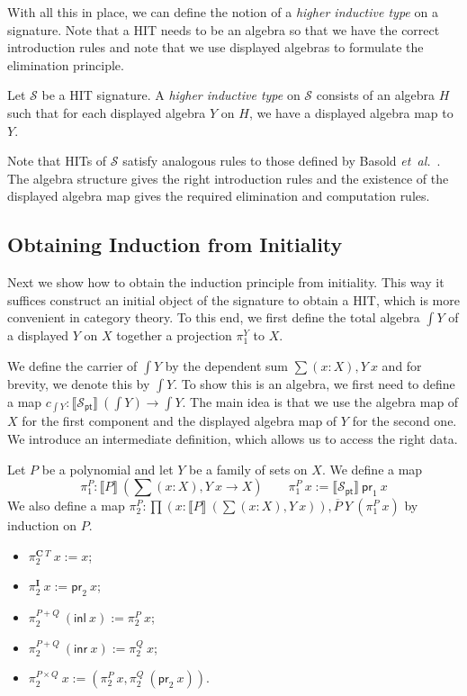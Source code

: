 \documentclass[9pt]{entcs}
\newcommand{\etal}{\emph{et~al.}}
\newcommand{\term}[1]{\mathsf{#1}}
\newcommand{\constructor}[1]{\mathbf{#1}}
\newcommand{\deprod}[3]{\prod(#1 : #2), #3} %
\newcommand{\desum}[3]{\sum(#1 : #2), #3} %
\newcommand{\0}{\textbf{0}} %
\newcommand{\inl}{\term{inl}} %
\newcommand{\inr}{\term{inr}} %
\newcommand{\prl}{\term{pr}_1} %
\newcommand{\prr}{\term{pr}_2} %
\newcommand{\Def}{:=} %
\newcommand{\C}{\constructor{C}} %
\newcommand{\I}{\constructor{I}} %
\newcommand{\sumP}[2]{#1 + #2} %
\newcommand{\prodP}[2]{#1 \times #2} %
\newcommand{\pt}[0]{\textsf{pt}}
\newcommand{\pointc}[1]{#1_{\pt}} %
\newcommand{\sig}{\mathcal{S}} %
\newcommand{\semP}[1]{\llbracket #1 \rrbracket} %
\newcommand{\polydact}[2]{\overline{#1} \> #2} %
\newcommand{\total}[1]{\int #1} %
\newcommand{\proj}[1]{\pi_1^{#1}} %
\newcommand{\Ppl}[1]{\pi_1^{#1}} %
\newcommand{\Ppr}[1]{\pi_2^{#1}} %
\begin{document}
With all this in place, we can define the notion of a \emph{higher inductive type} on a signature.
Note that a HIT needs to be an algebra so that we have the correct introduction rules and note that we use displayed algebras to formulate the elimination principle.

\begin{definition}
Let $\sig$ be a HIT signature.
A \emph{higher inductive type} on $\sig$ consists of an algebra $H$ such that for each displayed algebra $Y$ on $H$, we have a displayed algebra map to $Y$.
\end{definition}

Note that HITs of $\sig$ satisfy analogous rules to those defined by Basold \etal \ \cite{BasoldGW17}.
The algebra structure gives the right introduction rules and the existence of the displayed algebra map gives the required elimination and computation rules.

\subsection{Obtaining Induction from Initiality}
Next we show how to obtain the induction principle from initiality.
This way it suffices construct an initial object of the signature to obtain a HIT, which is more convenient in category theory.
To this end, we first define the total algebra $\total{Y}$ of a displayed $Y$ on $X$ together a projection $\proj{Y}$ to $X$.

We define the carrier of $\total{Y}$ by the dependent sum $\desum{x}{X}{Y \> x}$ and for brevity, we denote this by $\total{Y}$.
To show this is an algebra, we first need to define a map $c_{\total{Y}} : \semP{\pointc{\sig}} \> (\total{Y}) \rightarrow \total{Y}$.
The main idea is that we use the algebra map of $X$ for the first component and the displayed algebra map of $Y$ for the second one.
We introduce an intermediate definition, which allows us to access the right data.

\begin{definition}
Let $P$ be a polynomial and let $Y$ be a family of sets on $X$.
We define a map
\[
\Ppl{P} : \semP{P} \> (\desum{x}{X}{Y \> x} \rightarrow X)
\quad \quad
\Ppl{P} \> x \Def \semP{\pointc{\sig}} \> \prl \> x
\]
We also define a map $\Ppr{P} : \deprod{x}{\semP{P} \> (\desum{x}{X}{Y \> x})}{\polydact{P}{Y} \> (\Ppl{P} \> x)}$ by induction on $P$.
\begin{itemize}
	\item $\Ppr{\C \> T} \> x  \Def x$;
	\item $\Ppr{\I} \> x \Def \prr \> x$;
	\item $\Ppr{\sumP{P}{Q}} \> (\inl \> x) \Def \Ppr{P} \> x$;
	\item $\Ppr{\sumP{P}{Q}} \> (\inr \> x) \Def \Ppr{Q} \> x$;
	\item $\Ppr{\prodP{P}{Q}} \> x \Def (\Ppr{P} \> x , \Ppr{Q} \> (\prr \> x))$.
\end{itemize}
\end{definition}
\end{document}
